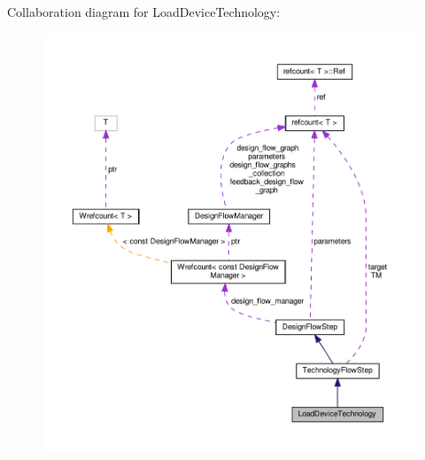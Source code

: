 Collaboration diagram for Load\+Device\+Technology\+:
\nopagebreak
\begin{figure}[H]
\begin{center}
\leavevmode
\includegraphics[width=350pt]{d4/d18/classLoadDeviceTechnology__coll__graph}
\end{center}
\end{figure}
